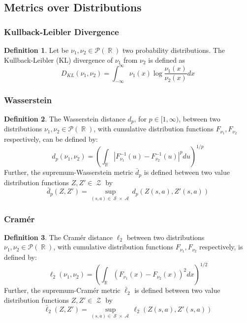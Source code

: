 \documentclass[12pt,a4paper,openright,twoside]{article}
\DeclareMathOperator*{\R}{\mathbb{R}}
\DeclareMathOperator*{\Sspace}{\mathcal{S}}
\DeclareMathOperator*{\A}{\mathcal{A}}
\DeclareMathOperator*{\Z}{\mathcal{Z}}
\numberwithin{equation}{section}
\theoremstyle{definition}
\newtheorem{definition}{Definition}
\theoremstyle{remark}
\theoremstyle{plain}
\begin{document}
\subsection{Metrics over Distributions} \label{metrics}


\subsubsection{Kullback-Leibler Divergence}

\begin{definition}
	Let be $\nu_1, \nu_2 \in \mathscr{P}(\R)$ two probability distributions. The Kullback-Leibler (KL) divergence of $\nu_1$ from $\nu_2$ is defined as
	\begin{equation*}
		D_{KL} (\nu_1,\nu_2) = \int_{-\infty}^{\infty} \nu_1(x) \log \frac{\nu_1(x)}{\nu_2(x)} dx
	\end{equation*}
\end{definition}

\subsubsection{Wasserstein}

\begin{definition}
	The Wasserstein distance $d_p$, for $p\in [1,\infty)$, between two distributions $\nu_1, \nu_2 \in \mathscr{P}(\R)$, with cumulative distribution functions $F_{\nu_1}, F_{\nu_2}$ respectively, can be defined by:
	\begin{equation*}
		d_p(\nu_1,\nu_2) = \left( \int_{\R} | F_{\nu_1}^{-1}(u) - F_{\nu_2}^{-1}(u)|^p du \right) ^{1/p}
	\end{equation*}
	Further, the supremum-Wasserstein metric $\bar{d}_p$ is defined between two value distribution functions $Z, Z' \in \Z$ by
	\begin{equation*}
		\bar{d}_p(Z,Z') = \sup_{(s,a) \in \Sspace \times \A} d_p(Z(s,a), Z'(s,a))
	\end{equation*}
\end{definition}


\subsubsection{Cramér}

\begin{definition}
	The Cramér distance $\ell_2$ between two distributions $\nu_1, \nu_2 \in \mathscr{P}(\R)$, with cumulative distribution functions $F_{\nu_1}, F_{\nu_2}$ respectively, is defined by:
	\begin{equation*}
		\ell_2(\nu_1,\nu_2) = \left( \int_{\R} (F_{\nu_1}(x) - F_{\nu_2}(x))^2dx \right) ^{1/2}
	\end{equation*}
	Further, the supremum-Cramér metric $\bar{\ell}_2$ is defined between two value distribution functions $Z, Z' \in \Z$ by
	\begin{equation*}
		\bar{\ell}_2(Z,Z') = \sup_{(s,a) \in \Sspace \times \A} \ell_2(Z(s,a), Z'(s,a))
	\end{equation*}
\end{definition}
\end{document}
